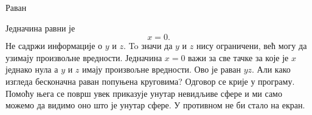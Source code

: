 \documentclass[sr]{./../../common/SurferDesc}%
\begin{document}
\footnotesize
%

\begin{surferPage}
  \begin{surferTitle}Раван\end{surferTitle}
   \begin{surferText}

Једначина равни је \[x=0.\] Не садржи информације о $y$ и $z$. To значи да $y$ и $z$ нису ограничени, већ могу да узимају произвољне вредности.
Једначина $x=0$ важи за све тачке за које је $x$ једнако нула а $y$ и $z$ имају произвољне вредности. Ово је раван $yz$.
\newline \newline
Али како изгледа бесконачна раван попуњена круговима? Одговор се крије у програму. Помоћу њега се површ увек приказује унутар невидљиве сфере и ми само можемо да видимо оно што је унутар сфере. У противном не би стало на екран.

     \end{surferText}
\end{surferPage}

\end{document}
